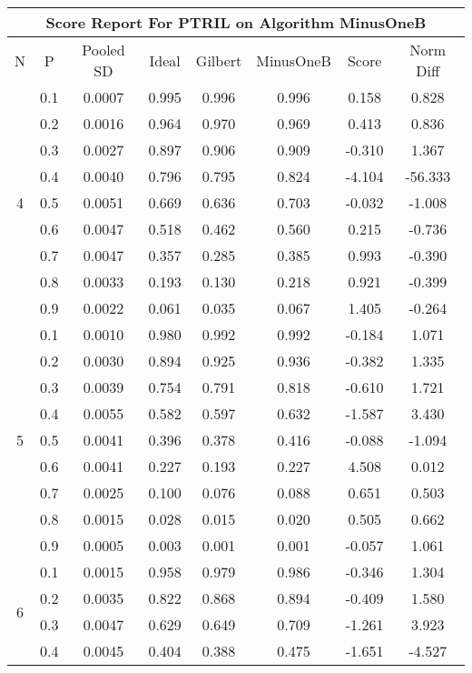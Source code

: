 \documentclass[11pt,a4paper]{report}
\begin{document}
\begin{longtable}{ | c | c || c | c | c | c | c | c | }
\hline
\multicolumn{8}{|c|}{ Score Report For PTRIL on Algorithm MinusOneB} \\
\hline
N & P & Pooled SD &  Ideal &  Gilbert & MinusOneB  & Score & Norm Diff \\
 \hline
 \hline
 \endhead
\multirow{9}{*}{4} & 0.1 & 0.0007 & 0.995 & 0.996 & 0.996 & 0.158 & 0.828 \\
 & 0.2 & 0.0016 & 0.964 & 0.970 & 0.969 & 0.413 & 0.836 \\
 & 0.3 & 0.0027 & 0.897 & 0.906 & 0.909 & -0.310 & 1.367 \\
 & 0.4 & 0.0040 & 0.796 & 0.795 & 0.824 & -4.104 & -56.333 \\
 & 0.5 & 0.0051 & 0.669 & 0.636 & 0.703 & -0.032 & -1.008 \\
 & 0.6 & 0.0047 & 0.518 & 0.462 & 0.560 & 0.215 & -0.736 \\
 & 0.7 & 0.0047 & 0.357 & 0.285 & 0.385 & 0.993 & -0.390 \\
 & 0.8 & 0.0033 & 0.193 & 0.130 & 0.218 & 0.921 & -0.399 \\
 & 0.9 & 0.0022 & 0.061 & 0.035 & 0.067 & 1.405 & -0.264 \\
 \hline
\multirow{9}{*}{5} & 0.1 & 0.0010 & 0.980 & 0.992 & 0.992 & -0.184 & 1.071 \\
 & 0.2 & 0.0030 & 0.894 & 0.925 & 0.936 & -0.382 & 1.335 \\
 & 0.3 & 0.0039 & 0.754 & 0.791 & 0.818 & -0.610 & 1.721 \\
 & 0.4 & 0.0055 & 0.582 & 0.597 & 0.632 & -1.587 & 3.430 \\
 & 0.5 & 0.0041 & 0.396 & 0.378 & 0.416 & -0.088 & -1.094 \\
 & 0.6 & 0.0041 & 0.227 & 0.193 & 0.227 & 4.508 & 0.012 \\
 & 0.7 & 0.0025 & 0.100 & 0.076 & 0.088 & 0.651 & 0.503 \\
 & 0.8 & 0.0015 & 0.028 & 0.015 & 0.020 & 0.505 & 0.662 \\
 & 0.9 & 0.0005 & 0.003 & 0.001 & 0.001 & -0.057 & 1.061 \\
 \hline
\multirow{9}{*}{6} & 0.1 & 0.0015 & 0.958 & 0.979 & 0.986 & -0.346 & 1.304 \\
 & 0.2 & 0.0035 & 0.822 & 0.868 & 0.894 & -0.409 & 1.580 \\
 & 0.3 & 0.0047 & 0.629 & 0.649 & 0.709 & -1.261 & 3.923 \\
 & 0.4 & 0.0045 & 0.404 & 0.388 & 0.475 & -1.651 & -4.527 \\

\end{longtable}
\end{document}
